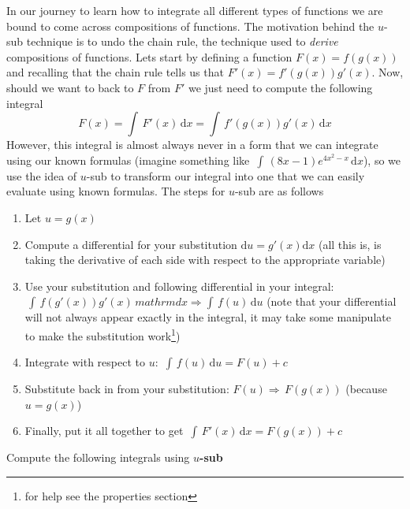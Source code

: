 \documentclass[addpoints]{exam}
\theoremstyle{definition}
\theoremstyle{plain}
\begin{document}
\begin{tcolorbox}[breakable, title=\subsection{U-SUB}, colframe=black, sharp corners, colback=Azure4!30, colbacktitle=DeepPink2!60, coltitle=black]
    In our journey to learn how to integrate all different types of functions we are bound to come across compositions of functions. The motivation behind the $u$-sub technique is to undo the chain rule, the technique used to \emph{derive} compositions of functions. Lets start by defining a function $F(x)=f(g(x))$ and recalling that the chain rule tells us that $F'(x)=f'(g(x))g'(x)$. Now, should we want to back to $F$ from $F'$ we just need to compute the following integral
    \[
        F(x) = \int\,F'(x)\,\mathrm{d}x = \int\,f'(g(x))g'(x)\,\mathrm{d}x
    \]
    However, this integral is almost always never in a form that we can integrate using our known formulas (imagine something like $\displaystyle\,\int\,\left(8x-1\right)e^{4x^2-x}\,\mathrm{d}x$), so we use the idea of $u$-sub to transform our integral into one that we can easily evaluate using known formulas. The steps for $u$-sub are as follows
    \begin{enumerate}
        \item Let $u=g(x)$
        \item Compute a differential for your substitution $\mathrm{d}u=g'(x)\mathrm{d}x$ (all this is, is taking the derivative of each side with respect to the appropriate variable)
        \item Use your substitution and following differential in your integral: $\displaystyle\,\int\,f(g'(x))g'(x)\,mathrm{d}x\Rightarrow\int\,f(u)\,\mathrm{d}u$ {\small (note that your differential will not always appear exactly in the integral, it may take some manipulate to make the substitution work\footnote{for help see the properties section})}
        \item Integrate with respect to $u$: $\displaystyle\,\int\,f(u)\,\mathrm{d}u = F(u) + c$
        \item Substitute back in from your substitution: $F(u)\Rightarrow\,F(g(x))$ (because $u=g(x)$)
        \item Finally, put it all together to get $\displaystyle\,\int\,F'(x)\,\mathrm{d}x = F(g(x)) + c$
    \end{enumerate}
\end{tcolorbox}
Compute the following integrals using \textbf{$u$-sub}
\end{document}
